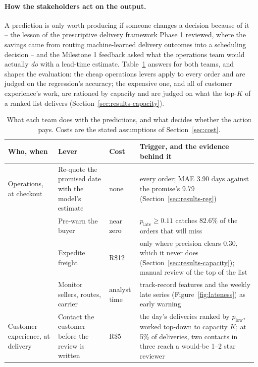 \paragraph{How the stakeholders act on the output.}
A prediction is only worth producing if someone changes a decision because of
it -- the lesson of the prescriptive delivery framework Phase 1 reviewed, where
the savings came from routing machine-learned delivery outcomes into a
scheduling decision \citep{kandula2021prescriptive} -- and the Milestone 1
feedback asked what the operations team would actually \emph{do} with a
lead-time estimate. Table~\ref{tab:levers} answers for both
teams, and shapes the evaluation: the cheap operations levers apply to every
order and are judged on the regression's accuracy; the expensive one, and all
of customer experience's work, are rationed by capacity and are judged on what
the top-$K$ of a ranked list delivers (Section~\ref{sec:results-capacity}).

\begin{table}[htbp]
\centering
\caption{What each team does with the predictions, and what decides whether
the action pays. Costs are the stated assumptions of Section~\ref{sec:cost}.}
\label{tab:levers}
\small
\begin{tabular}{@{}p{2.0cm}p{3.6cm}p{1.35cm}p{6.9cm}@{}}
\toprule
\textbf{Who, when} & \textbf{Lever} & \textbf{Cost} & \textbf{Trigger, and the evidence behind it} \\
\midrule
Operations, at checkout & Re-quote the promised date with the model's estimate & none & every order; MAE 3.90 days against the promise's 9.79 (Section~\ref{sec:results-reg}) \\[2pt]
 & Pre-warn the buyer & near zero & $p_{\text{late}} \ge 0.11$ catches 82.6\% of the orders that will miss \\[2pt]
 & Expedite freight & R\$12 & only where precision clears 0.30, which it never does (Section~\ref{sec:results-capacity}); manual review of the top of the list \\[2pt]
 & Monitor sellers, routes, carrier & analyst time & track-record features and the weekly late series (Figure~\ref{fig:lateness}) as early warning \\[2pt]
\midrule
Customer experience, at delivery & Contact the customer before the review is written & R\$5 & the day's deliveries ranked by $p_{\text{low}}$, worked top-down to capacity $K$; at 5\% of deliveries, two contacts in three reach a would-be 1--2 star reviewer \\
\bottomrule
\end{tabular}
\end{table}

